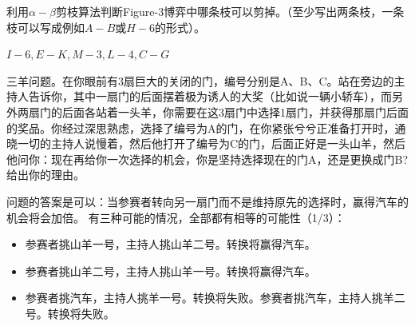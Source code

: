 \begin{problem}
	利用$\alpha-\beta$剪枝算法判断Figure-3博弈中哪条枝可以剪掉。（至少写出两条枝，一条枝可以写成例如$A-B$或$H-6$的形式）。
\end{problem}
\begin{solution}
	$I-6, E-K, M-3, L-4, C-G$
\end{solution}


\begin{problem}
	
	三羊问题。在你眼前有$3$扇巨大的关闭的门，编号分别是A、B、C。站在旁边的主持人告诉你，其中一扇门的后面摆着极为诱人的大奖（比如说一辆小轿车），而另外两扇门的后面各站着一头羊，你需要在这3扇门中选择1扇门，并获得那扇门后面的奖品。你经过深思熟虑，选择了编号为A的门，在你紧张兮兮正准备打开时，通晓一切的主持人说慢着，然后他打开了编号为C的门，后面正好是一头山羊，然后他问你：现在再给你一次选择的机会，你是坚持选择现在的门A，还是更换成门B?给出你的理由。
\end{problem}
\begin{solution}
	问题的答案是可以：当参赛者转向另一扇门而不是维持原先的选择时，赢得汽车的机会将会加倍。
	有三种可能的情况，全部都有相等的可能性（1/3）：
	\begin{itemize}
		\item 参赛者挑山羊一号，主持人挑山羊二号。转换将赢得汽车。
		\item 参赛者挑山羊二号，主持人挑山羊一号。转换将赢得汽车。
		\item 参赛者挑汽车，主持人挑羊一号。转换将失败。参赛者挑汽车，主持人挑羊二号。转换将失败。
	\end{itemize}
\end{solution}



